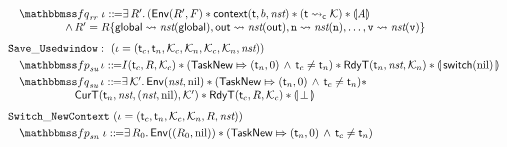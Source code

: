 \begin{figure}[!t]
\[\begin{array}{l}
            \\[-9pt]
            \quad
            \relspecpost_{\textit{rr}} \ \lgvl \define \exists \, \RFile'. \,  (\Env{\RFile', \Wstack}
            \sepstar \relcontext{\thrdid}{\block}{\nst} \sepstar 
            (\astCurCont{\thrdid}{\hthrdlocalst}) \sepstar \safePrimAst{\primcom} \\
            \hspace*{5em}
            \, \land \, 
            \RFile' = \RFile\{ \globalRN \rightsquigarrow \nst(\globalRN), 
                \outRN \rightsquigarrow \nst(\outRN), \regn \rightsquigarrow \nst(\regn), 
                \dots, \regv \rightsquigarrow \nst(\regv) \} \\
            \\[-5pt]
            \SaveUsedWin{}: \ 
            (\lgvl = (\thrdid_c, \thrdid_n, \hthrdlocalst_c, \hthrdlocalst_n, 
                \hthrdlocalst_c, \hthrdlocalst_n, \nst)) \\
            \\[-9pt]
            \quad
            \relspecpre_{\textit{su}} \, \lgvl \define 
            I(\thrdid_c, \RFile, \hthrdlocalst_c) \sepstar 
            (\relmsto{\TaskNew}{(\thrdid_n, 0)} \, \land \, \thrdid_c \neq \thrdid_n) 
            \sepstar
            \RelRdyT{\thrdid_n}{\nst}{\hthrdlocalst_n} \sepstar 
            \safePrimAst{\, \primsw(\nil) \,} \\
            \\[-9pt]
            \quad
            \relspecpost_{\textit{su}} \, \lgvl \define 
            \exists \, \hthrdlocalst'. \, 
            \Env{\nst, \nil} \sepstar 
            (\relmsto{\TaskNew}{(\thrdid_n, 0)} \, \land \, \thrdid_c \neq \thrdid_n) \sepstar \\
            \hspace*{6em}
            \RelCurT{\thrdid_n}{\nst}{(\nst, \nil)}{\hthrdlocalst'} 
            \sepstar \RelRdyT{\thrdid_c}{\RFile}{\hthrdlocalst_c}
            \sepstar \safePrimAst{\, \primdone \,}
            \\
            \\[-5pt]
            \SwitchNewTask{}
            \ (\lgvl = (\thrdid_c, \thrdid_n, \hthrdlocalst_c, 
            \hthrdlocalst_n, \RFile, \nst)) \\
            \\[-9pt]
            \quad 
            \relspecpre_{\textit{sn}} \ \lgvl \define 
            \exists \, \RFile_0. \, \Env{(\RFile_0, \nil)} \sepstar 
            (\relmsto{\TaskNew}{(\thrdid_n, 0)} \, \land \, \thrdid_c \neq \thrdid_n)

\end{array}\]
\end{figure}
